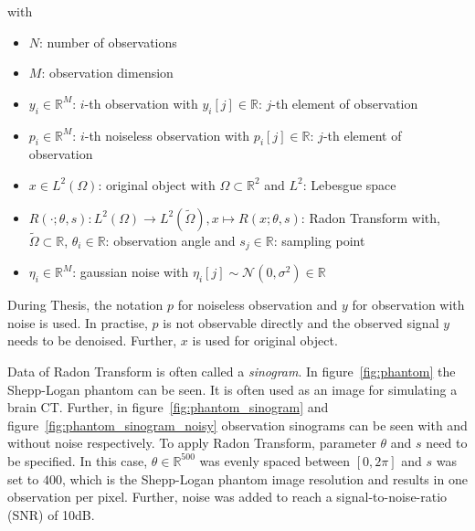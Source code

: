 with
\begin{itemize}
    \item $N$: number of observations
    \item $M$: observation dimension
    \item $y_i \in \mathbb{R}^M$:  $i$-th observation with $y_i[j] \in \mathbb{R}$: $j$-th element of observation
    \item $p_i \in \mathbb{R}^M$:  $i$-th noiseless observation with $p_i[j] \in \mathbb{R}$: $j$-th element of observation
    \item $x \in L^2(\Omega)$: original object with $\Omega \subset \mathbb{R}^2 $ and $L^2$: Lebesgue space
    \item $R(\cdot; \theta, s): L^2(\Omega) \to L^2(\tilde{\Omega}) , x \mapsto R(x; \theta,s)$: Radon Transform \cite{radonTransform} with,\\
        $\tilde{\Omega} \subset \mathbb{R}$, $\theta_i \in \mathbb{R}$: observation angle and $s_j \in \mathbb{R}$: sampling point 
    \item $\eta_i \in \mathbb{R}^M$: gaussian noise with $\eta_i[j] \sim \mathcal{N}(0,\sigma^2) \in \mathbb{R}$
\end{itemize}

\begin{tcolorbox}[colback=red!5!white,colframe=red!75!black]
    During Thesis, the notation $p$ for noiseless observation and $y$ for observation with noise is used.
    In practise, $p$ is not observable directly and the observed signal $y$ needs to be denoised.
    Further, $x$ is used for original object.
\end{tcolorbox}



Data of Radon Transform is often called a \textit{sinogram}.
In figure~\ref{fig:phantom} the Shepp-Logan phantom can be seen. 
It is often used as an image for simulating a brain CT.
Further, in figure~\ref{fig:phantom_sinogram} and figure~\ref{fig:phantom_sinogram_noisy} 
observation sinograms can be seen with and without noise respectively. 
To apply Radon Transform, parameter $\theta$ and $s$ need to be specified.
In this case, $\theta \in \mathbb{R}^{500}$ was evenly spaced
between $[0, 2 \pi]$ and $s$ was set to $400$, which is the Shepp-Logan phantom image resolution
and results in one observation per pixel.
Further, noise was added to reach a signal-to-noise-ratio (SNR) of 10dB.

